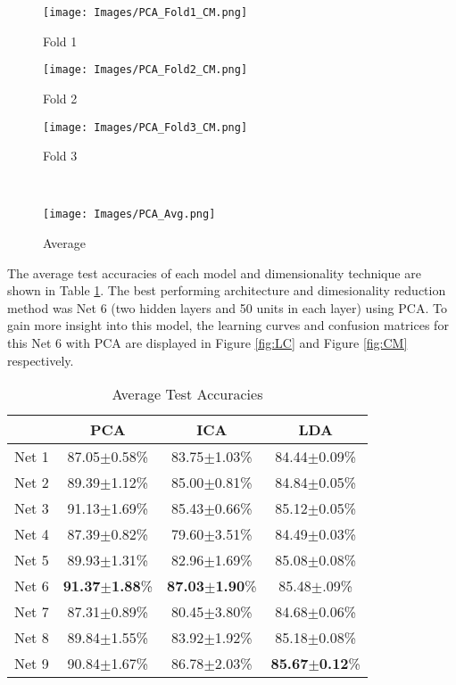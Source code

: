 \documentclass[conference]{IEEEtran}
\begin{document}
\begin{figure*}[htb!]
	\begin{subfigure}{.24\textwidth}{
			\texttt{[image: Images/PCA\_Fold1\_CM.png]}
			\caption{Fold 1}
			\label{fig:Fold1CM}
		}
	\end{subfigure}
	\begin{subfigure}{.24\textwidth}{
			\texttt{[image: Images/PCA\_Fold2\_CM.png]}
			\caption{Fold 2}
			\label{fig:Fold2CM}
		}
	\end{subfigure}
	\begin{subfigure}{.24\textwidth}{
			\texttt{[image: Images/PCA\_Fold3\_CM.png]}
			\caption{Fold 3}
			\label{fig:Fold3CM}
		}
	\end{subfigure}
~
	\begin{subfigure}{.24\textwidth}{
		\texttt{[image: Images/PCA\_Avg.png]}
		\caption{Average}
		\label{fig:AvgCM}
	}
\end{subfigure}  
	
	\caption{Test Confusion Matrices for Net 6 using PCA.}
	\centering
	\label{fig:CM}
\end{figure*} 

The average test accuracies of each model and dimensionality technique are shown in Table \ref{Acc}. The best performing architecture and dimesionality reduction method was Net 6 (two hidden layers and 50 units in each layer) using PCA. To gain more insight into this model, the learning curves and confusion matrices for this Net 6 with PCA are displayed in Figure \ref{fig:LC} and Figure \ref{fig:CM} respectively. 
\begin{table}[t]
	\centering
	\caption{Average Test Accuracies}
	\begin{tabular}{|c|c|c|c|}
		\hline
		& PCA            & ICA            & LDA \\ \hline
		Net 1 & 87.05$\pm$0.58\% & 83.75$\pm$1.03\% & 84.44$\pm$0.09\% \\ \hline
		Net 2 & 89.39$\pm$1.12\% & 85.00$\pm$0.81\% & 84.84$\pm$0.05\%    \\ \hline
		Net 3 & 91.13$\pm$1.69\% & 85.43$\pm$0.66\% & 85.12$\pm$0.05\%    \\ \hline
		Net 4 & 87.39$\pm$0.82\% & 79.60$\pm$3.51\% & 84.49$\pm$0.03\%    \\ \hline
		Net 5 & 89.93$\pm$1.31\% & 82.96$\pm$1.69\% & 85.08$\pm$0.08\%    \\ \hline
		Net 6 & \textbf{91.37$\pm$1.88}\% & \textbf{87.03$\pm$1.90}\% & 85.48$\pm$.09\%    \\ \hline
		Net 7 & 87.31$\pm$0.89\% & 80.45$\pm$3.80\% &84.68$\pm$0.06\% \\ \hline
		Net 8 & 89.84$\pm$1.55\% & 83.92$\pm$1.92\% &85.18$\pm$0.08\%     \\ \hline
		Net 9 & 90.84$\pm$1.67\% & 86.78$\pm$2.03\% &\textbf{85.67$\pm$0.12}\%     \\ \hline
	\end{tabular}
\label{Acc}
\end{table}
\end{document}

